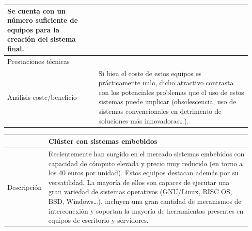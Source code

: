 \begin{table}
\begin{tabular}{|p{2.3cm}|p{6.5cm}|p{6.5cm}|}
Se cuenta con un número suficiente de equipos para la creación del sistema final.\\
\hline
Prestaciones técnicas&&\\
\hline
Análisis coste/beneficio&&Si bien el coste de estos equipos es prácticamente nulo, dicho atractivo contrasta con los potenciales problemas que el uso de estos sistemas puede implicar (obsolescencia, uso de sistemas convencionales en detrimento de soluciones más innovadoras\dots).\\
\hline
\end{tabular}
\end{table}

\begin{table}
\begin{tabular}{|p{2.3cm}|p{11cm}|}
\hline
&\textbf{Clúster con sistemas embebidos}\\
\hline
Descripción&Recientemente han surgido en el mercado sistemas embebidos con capacidad de cómputo elevada y precio muy reducido (en torno a los 40 euros por unidad). Estos equipos destacan además por su versatilidad. La mayoría de ellos son capaces de ejecutar una gran variedad de sistemas operativos (GNU/Linux, RISC OS, BSD, Windows\dots), incluyen una gran cantidad de mecanismos de interconexión y soportan la mayoría de herramientas presentes en equipos de escritorio y servidores.


\end{tabular}
\end{table}
